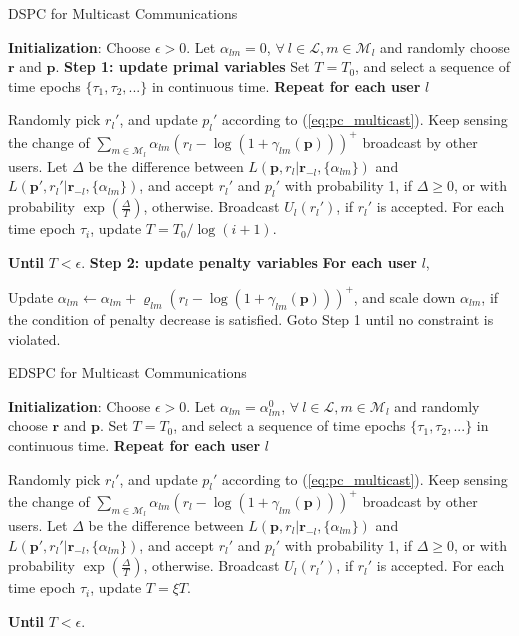 \documentclass[10pt,journal,letterpaper,compsoc]{IEEEtran}
\begin{document}
{{\begin{algorithm}
\caption{DSPC for Multicast Communications}
\label{alg:dspc_multicast}
\begin{algorithmic}
\STATE \textbf{Initialization}: Choose $\epsilon>0$. Let $\alpha_{lm}=0$, $\forall~l\in\mathcal{L}, m\in\mathcal{M}_l$ and randomly choose $\mathbf{r}$ and $\mathbf{p}$.
\STATE \textbf{Step 1: update primal variables}
\STATE Set $T=T_0$, and select a sequence of time epochs $\{\tau_1,\tau_2,... \}$ in continuous time.
\STATE \quad \textbf{Repeat for each user} $l$
\begin{enumerate}
\STATE Randomly pick $r_l'$, and update $p_l'$ according to (\ref{eq:pc_multicast}).
\STATE Keep sensing the change of $\sum_{m\in\mathcal{M}_l}\alpha_{lm}(r_l-\log(1+\gamma_{lm}(\mathbf{p})))^{+}$ broadcast by other users.
\STATE Let $\Delta$ be the difference between $L(\mathbf{p},r_l|\mathbf{r}_{-l},\{\alpha_{lm}\})$ and $L(\mathbf{p}',r_l'|\mathbf{r}_{-l},\{\alpha_{lm}\})$, and accept $r_l'$ and $p_l'$ with probability 1, if $\Delta\ge 0$, or with probability $\exp(\frac{\Delta}{T})$, otherwise.
\STATE Broadcast $U_l(r_l')$, if $r_l'$ is accepted.
\STATE For each time epoch $\tau_i$, update $T=T_0/\log(i+1)$.
\end{enumerate}
\STATE \quad \textbf{Until} $T<\epsilon$.
\STATE \textbf{Step 2: update penalty variables}
\STATE \quad \textbf{For each user} $l$,
\begin{enumerate}
\STATE Update $\alpha_{lm}\leftarrow \alpha_{lm}+\varrho_{lm}(r_l-\log(1+\gamma_{lm}(\mathbf{p})))^{+}$, and scale down $\alpha_{lm}$, if the condition of penalty decrease is satisfied.
\STATE Goto Step 1 until no constraint is violated.
\end{enumerate}
\end{algorithmic}
\end{algorithm}


\begin{algorithm}
\caption{EDSPC for Multicast Communications}
\label{alg:hdspc_multicast}
\begin{algorithmic}
\STATE \textbf{Initialization}: Choose $\epsilon>0$. Let $\alpha_{lm}=\alpha_{lm}^0$, $\forall~l\in\mathcal{L}, m\in\mathcal{M}_l$ and randomly choose $\mathbf{r}$ and $\mathbf{p}$.
\STATE Set $T=T_0$, and select a sequence of time epochs $\{\tau_1,\tau_2,... \}$ in continuous time.
\STATE \textbf{Repeat for each user} $l$
\begin{enumerate}
\STATE Randomly pick $r_l'$, and update $p_l'$ according to (\ref{eq:pc_multicast}).
\STATE Keep sensing the change of $\sum_{m\in\mathcal{M}_l}\alpha_{lm}(r_l-\log(1+\gamma_{lm}(\mathbf{p})))^{+}$ broadcast by other users.
\STATE Let $\Delta$ be the difference between $L(\mathbf{p},r_l|\mathbf{r}_{-l},\{\alpha_{lm}\})$ and $L(\mathbf{p}',r_l'|\mathbf{r}_{-l},\{\alpha_{lm}\})$, and accept $r_l'$ and $p_l'$ with probability 1, if $\Delta\ge 0$, or with probability $\exp(\frac{\Delta}{T})$, otherwise.
\STATE Broadcast $U_l(r_l')$, if $r_l'$ is accepted.
\STATE For each time epoch $\tau_i$, update $T=\xi T$.
\end{enumerate}
\STATE \textbf{Until} $T<\epsilon$.
\end{algorithmic}
\end{algorithm}

}}
\end{document}
